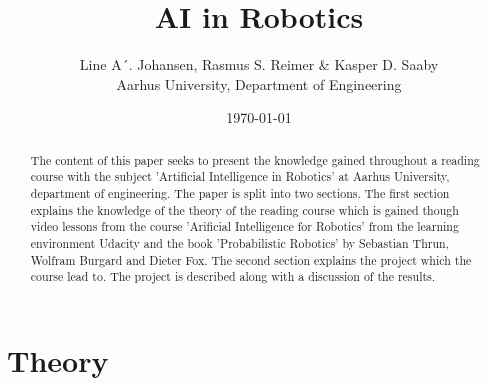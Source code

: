 

\title{
	\textbf{AI in Robotics}
}

\author{
	Line A´. Johansen, Rasmus S. Reimer \& Kasper D. Saaby\\
	Aarhus University, Department of Engineering \\
}
\date{\today}




\maketitle

\tableofcontents


\begin{abstract}
The content of this paper seeks to present the knowledge gained throughout a reading course with the subject 'Artificial Intelligence in Robotics' at Aarhus University, department of engineering. The paper is split into two sections. The first section explains the knowledge of the theory of the reading course which is gained though video lessons from the course 'Arificial Intelligence for Robotics' from the learning environment Udacity and the book 'Probabilistic Robotics' by Sebastian Thrun, Wolfram Burgard and Dieter Fox. The second section explains the project which the course lead to. The project is described along with a discussion of the results.
\end{abstract}


\chapter{Theory}








